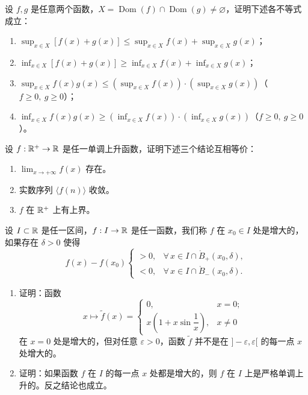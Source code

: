 \begin{exercise}
	\item 设 \(f,g\) 是任意两个函数，\(X=\operatorname{Dom}(f)\cap\operatorname{Dom}(g)\neq\varnothing\)，证明下述各不等式成立：
	\begin{enumerate}[label=\arabic*)]
		\item \(\sup_{x\in X}[f(x)+g(x)]\le\sup_{x\in X}f(x)+\sup_{x\in X}g(x)\)；
		\item \(\inf_{x\in X}[f(x)+g(x)]\ge\inf_{x\in X}f(x)+\inf_{x\in X}g(x)\)；
		\item \(\sup_{x\in X}f(x)g(x)\le(\sup_{x\in X}f(x))\cdot(\sup_{x\in X}g(x))\)（\(f\ge0,\ g\ge0\)）；
		\item \(\inf_{x\in X}f(x)g(x)\ge(\inf_{x\in X}f(x))\cdot(\inf_{x\in X}g(x))\)（\(f\ge0,\ g\ge0\)）。
	\end{enumerate}
\end{exercise}

\begin{exercise}
	\item 设 \(f:\mathbb{R}^+\to\mathbb{R}\) 是任一单调上升函数，证明下述三个结论互相等价：
	\begin{enumerate}[label=\arabic*)]
		\item \(\lim_{x\to+\infty}f(x)\) 存在。
		\item 实数序列 \(\langle f(n)\rangle\) 收敛。
		\item \(f\) 在 \(\mathbb{R}^+\) 上有上界。
	\end{enumerate}
\end{exercise}

\begin{exercise}
	\item 设 \(I\subset\mathbb{R}\) 是任一区间，\(f:I\to\mathbb{R}\) 是任一函数，我们称 \(f\) 在 \(x_0\in I\) 处是增大的，如果存在 \(\delta>0\) 使得
	\[
	f(x)-f(x_0)\begin{cases} >0, & \forall\,x\in I\cap\mathring{B}_+(x_0,\delta), \\ <0, & \forall\,x\in I\cap\mathring{B}_-(x_0,\delta). \end{cases}
	\]
	\begin{enumerate}[label=\arabic*)]
		\item 证明：函数
		\[
		x\longmapsto\widetilde f(x)=\begin{cases} 0, & x=0; \\ x\left(1+x\sin\dfrac1x\right), & x\neq0 \end{cases}
		\]
		在 \(x=0\) 处是增大的，但对任意 \(\varepsilon>0\)，函数 \(\widetilde f\) 并不是在 \(]-\varepsilon,\varepsilon[\) 的每一点 \(x\) 处增大的。
		\item 证明：如果函数 \(f\) 在 \(I\) 的每一点 \(x\) 处都是增大的，则 \(f\) 在 \(I\) 上是严格单调上升的。反之结论也成立。
	\end{enumerate}
\end{exercise}

